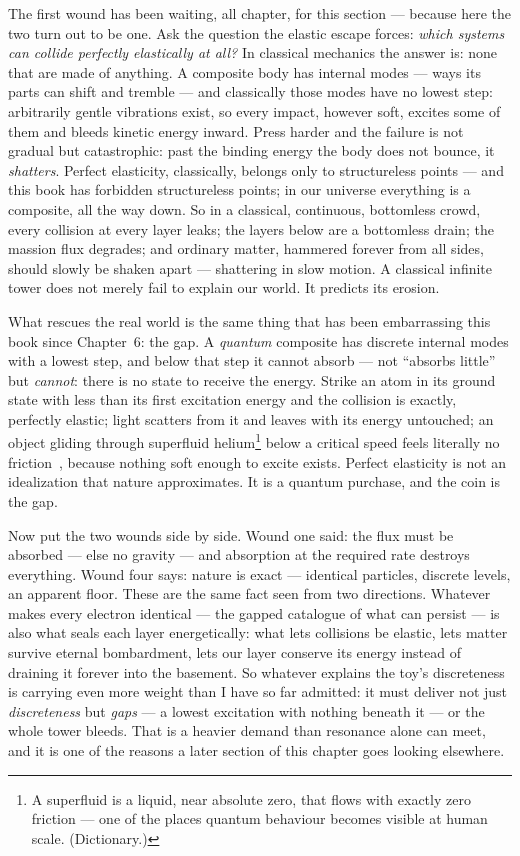 \documentclass[fontsize=11pt,paper=a4,pagesize=auto,parskip=half-]{scrbook}
\begin{document}
The first wound has been waiting, all chapter, for this section --- because here the two turn out to be one. Ask the question the elastic escape forces: \emph{which systems can collide perfectly elastically at all?} In classical mechanics the answer is: none that are made of anything. A composite body has internal modes --- ways its parts can shift and tremble --- and classically those modes have no lowest step: arbitrarily gentle vibrations exist, so every impact, however soft, excites some of them and bleeds kinetic energy inward. Press harder and the failure is not gradual but catastrophic: past the binding energy the body does not bounce, it \emph{shatters}. Perfect elasticity, classically, belongs only to structureless points --- and this book has forbidden structureless points; in our universe everything is a composite, all the way down. So in a classical, continuous, bottomless crowd, every collision at every layer leaks; the layers below are a bottomless drain; the massion flux degrades; and ordinary matter, hammered forever from all sides, should slowly be shaken apart --- shattering in slow motion. A classical infinite tower does not merely fail to explain our world. It predicts its erosion.

What rescues the real world is the same thing that has been embarrassing this book since Chapter~6: the gap. A \emph{quantum} composite has discrete internal modes with a lowest step, and below that step it cannot absorb --- not ``absorbs little'' but \emph{cannot}: there is no state to receive the energy. Strike an atom in its ground state with less than its first excitation energy and the collision is exactly, perfectly elastic; light scatters from it and leaves with its energy untouched; an object gliding through superfluid helium\footnote{A superfluid is a liquid, near absolute zero, that flows with exactly zero friction --- one of the places quantum behaviour becomes visible at human scale. (Dictionary.)} below a critical speed feels literally no friction~\cite{pitaevskii2016}, because nothing soft enough to excite exists. Perfect elasticity is not an idealization that nature approximates. It is a quantum purchase, and the coin is the gap.

Now put the two wounds side by side. Wound one said: the flux must be absorbed --- else no gravity --- and absorption at the required rate destroys everything. Wound four says: nature is exact --- identical particles, discrete levels, an apparent floor. These are the same fact seen from two directions. Whatever makes every electron identical --- the gapped catalogue of what can persist --- is also what seals each layer energetically: what lets collisions be elastic, lets matter survive eternal bombardment, lets our layer conserve its energy instead of draining it forever into the basement. So whatever explains the toy's discreteness is carrying even more weight than I have so far admitted: it must deliver not just \emph{discreteness} but \emph{gaps} --- a lowest excitation with nothing beneath it --- or the whole tower bleeds. That is a heavier demand than resonance alone can meet, and it is one of the reasons a later section of this chapter goes looking elsewhere.
\end{document}
